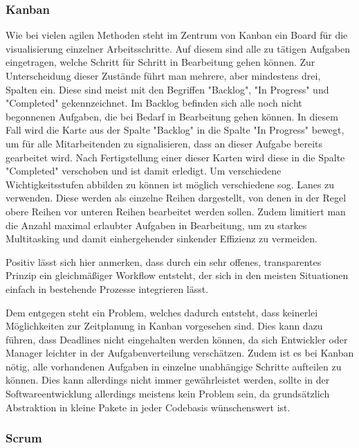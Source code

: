 \subsubsection{Kanban}\label{subsubsec:kanban}

Wie bei vielen agilen Methoden steht im Zentrum von Kanban ein Board für die visualisierung einzelner Arbeitsschritte.
Auf diesem sind alle zu tätigen Aufgaben eingetragen, welche Schritt für Schritt in Bearbeitung gehen können.
Zur Unterscheidung dieser Zustände führt man mehrere, aber mindestens drei, Spalten ein.
Diese sind meist mit den Begriffen "Backlog", "In Progress" und "Completed" gekennzeichnet.
Im Backlog befinden sich alle noch nicht begonnenen Aufgaben, die bei Bedarf in Bearbeitung gehen können.
In diesem Fall wird die Karte aus der Spalte "Backlog" in die Spalte "In Progress" bewegt, um für alle Mitarbeitenden zu signalisieren, dass an dieser Aufgabe bereits gearbeitet wird.
Nach Fertigstellung einer dieser Karten wird diese in die Spalte "Completed" verschoben und ist damit erledigt.
Um verschiedene Wichtigkeitsstufen abbilden zu können ist möglich verschiedene sog. Lanes zu verwenden.
Diese werden als einzelne Reihen dargestellt, von denen in der Regel obere Reihen vor unteren Reihen bearbeitet werden sollen.
Zudem limitiert man die Anzahl maximal erlaubter Aufgaben in Bearbeitung, um zu starkes Multitasking und damit einhergehender sinkender Effizienz zu vermeiden.

Positiv lässt sich hier anmerken, dass durch ein sehr offenes, transparentes Prinzip ein gleichmäßiger Workflow entsteht, der sich in den meisten Situationen einfach in bestehende Prozesse integrieren lässt.

Dem entgegen steht ein Problem, welches dadurch entsteht, dass keinerlei Möglichkeiten zur Zeitplanung in Kanban vorgesehen sind.
Dies kann dazu führen, dass Deadlines nicht eingehalten werden können, da sich Entwickler oder Manager leichter in der Aufgabenverteilung verschätzen.
Zudem ist es bei Kanban nötig, alle vorhandenen Aufgaben in einzelne unabhängige Schritte aufteilen zu können.
Dies kann allerdings nicht immer gewährleistet werden, sollte in der Softwareentwicklung allerdings meistens kein Problem sein, da grundsätzlich Abstraktion in kleine Pakete in jeder Codebasis wünschenswert ist.\cite{Kanban}

\subsubsection{Scrum}

